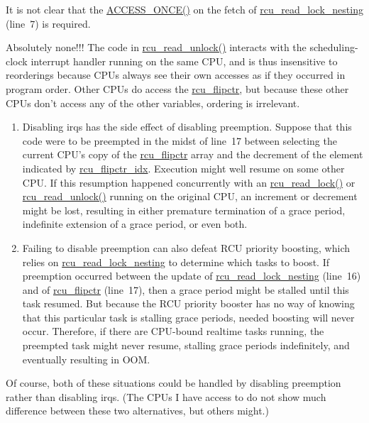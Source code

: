 It is not clear that the \url{ACCESS_ONCE()} on the
fetch of \url{rcu_read_lock_nesting} (line~7) is required.


	Absolutely none!!!  The code in \url{rcu_read_unlock()}
	interacts with the scheduling-clock interrupt handler
	running on the same CPU, and is thus insensitive to reorderings
	because CPUs always see their own accesses as if they occurred
	in program order.
	Other CPUs do access the \url{rcu_flipctr}, but because these
	other CPUs don't access any of the other variables, ordering is
	irrelevant.


\begin{enumerate}
\item	Disabling irqs has the side effect of disabling preemption.
	Suppose that this code were to be preempted in the midst
	of line~17 between selecting the current CPU's copy
	of the \url{rcu_flipctr} array and the decrement of
	the element indicated by \url{rcu_flipctr_idx}.
	Execution might well resume on some other CPU.
	If this resumption happened concurrently with an
	\url{rcu_read_lock()} or \url{rcu_read_unlock()}
	running on the original CPU,
	an increment or decrement might be lost, resulting in either
	premature termination of a grace period, indefinite extension
	of a grace period, or even both.
\item	Failing to disable preemption can also defeat RCU priority
	boosting, which relies on \url{rcu_read_lock_nesting}
	to determine which tasks to boost.
	If preemption occurred between the update of
	\url{rcu_read_lock_nesting} (line~16) and of
	\url{rcu_flipctr} (line~17), then a grace
	period might be stalled until this task resumed.
	But because the RCU priority booster has no way of knowing
	that this particular task is stalling grace periods, needed
	boosting will never occur.
	Therefore, if there are CPU-bound realtime tasks running,
	the preempted task might never resume, stalling grace periods
	indefinitely, and eventually resulting in OOM.
\end{enumerate}

Of course, both of these situations could be handled by disabling
preemption rather than disabling irqs.
(The CPUs I have access to do not show much difference between these
two alternatives, but others might.)

